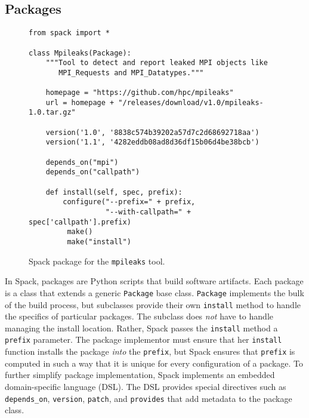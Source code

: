 
\subsection{Packages}\label{sec:packages}

\begin{figure}
\begin{verbatim}
from spack import *

class Mpileaks(Package):
    """Tool to detect and report leaked MPI objects like
       MPI_Requests and MPI_Datatypes."""

    homepage = "https://github.com/hpc/mpileaks"
    url = homepage + "/releases/download/v1.0/mpileaks-1.0.tar.gz"

    version('1.0', '8838c574b39202a57d7c2d68692718aa')
    version('1.1', '4282eddb08ad8d36df15b06d4be38bcb')

    depends_on("mpi")
    depends_on("callpath")

    def install(self, spec, prefix):
        configure("--prefix=" + prefix,
                  "--with-callpath=" + spec['callpath'].prefix)
         make()
         make("install")
\end{verbatim}
	\caption{
		Spack package for the {\tt mpileaks} tool.
		\label{fig:mpileaks}
	}
\end{figure}

In Spack, packages are Python scripts that build software artifacts.
Each package is a class that extends a generic {\tt Package}
base class.  {\tt Package} implements the bulk of the build process, but
subclasses provide their own {\tt install} method to handle the
specifics of particular packages. The subclass does {\it not} have to
handle managing the install location.  Rather, Spack passes the {\tt install}
method a {\tt prefix} parameter.  The package implementor must ensure that
her {\tt install} function installs the package {\it into} the {\tt prefix},
but Spack ensures that {\tt prefix} is computed in such a way that it is
unique for every configuration of a package.  To further simplify
package implementation, Spack implements an embedded domain-specific
language (DSL).
The DSL provides special directives such as {\tt depends\_on},
{\tt version}, {\tt patch}, and {\tt provides} that add metadata
to the package class.

